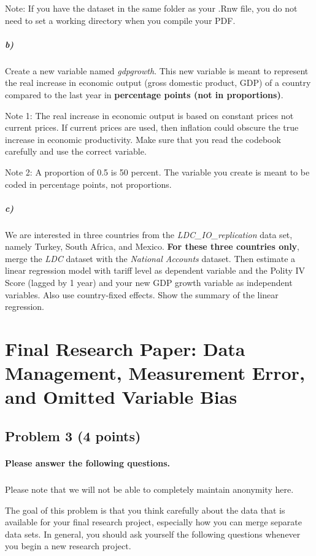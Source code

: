 \documentclass[12pt]{article}
\begin{document}
Note: If you have the dataset in the same folder as your .Rnw file, you do not need to set a working directory when you compile your PDF.

\subparagraph{b)} Create a new variable named \textit{gdpgrowth}. This new variable is meant to represent the real increase in economic output (gross domestic product, GDP) of a country compared to the last year in \textbf{percentage points (not in proportions)}.

Note 1: The real increase in economic output is based on constant prices not current prices. If current prices are used, then inflation could obscure the true increase in economic productivity. Make sure that you read the codebook carefully and use the correct variable.

Note 2: A proportion of 0.5 is 50 percent. The variable you create is meant to be coded in percentage points, not proportions.

\subparagraph{c)} We are interested in three countries from the \textit{LDC\_IO\_replication} data set, namely Turkey, South Africa, and Mexico. \textbf{For these three countries only}, merge the \textit{LDC} dataset with the \textit{National Accounts} dataset. Then estimate a linear regression model with tariff level as dependent variable and the Polity IV Score (lagged by 1 year) and your new GDP growth variable as independent variables. Also use country-fixed effects. Show the summary of the linear regression.



\section*{Final Research Paper: Data Management, Measurement Error, and Omitted Variable Bias}

\subsection*{Problem 3 (4 points)}

\paragraph{Please answer the following questions.}

\subparagraph{} Please note that we will not be able to completely maintain anonymity here.

The goal of this problem is that you think carefully about the data that is available for your final research project, especially how you can merge separate data sets. In general, you should ask yourself the following questions whenever you begin a new research project.
\end{document}
